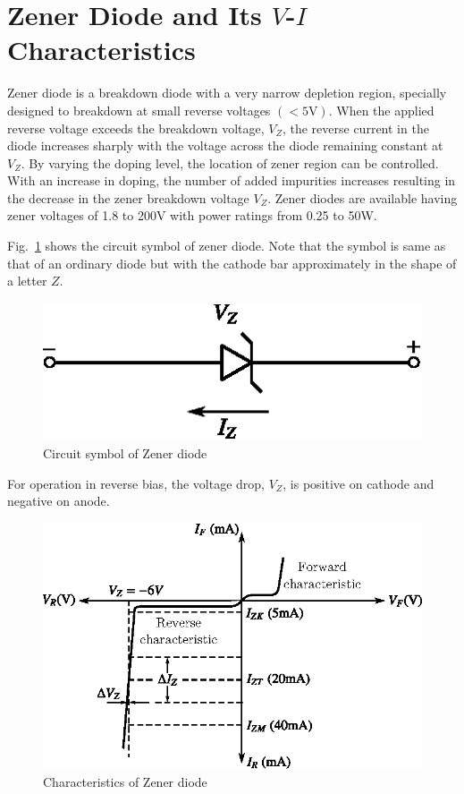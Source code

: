 \section[Zener Diode and Its $V$-$I$ Characteristics]{Zener Diode and Its \boldmath$V$-$I$ Characteristics}\label{sec1.23}

Zener diode is a breakdown diode with a very narrow depletion region, specially designed to breakdown at small reverse voltages $(<5\text{V})$. When the applied reverse voltage exceeds the breakdown voltage, $V_{Z}$, the reverse current in the diode increases sharply with the voltage across the diode remaining constant at $V_{Z}$. By varying the doping level, the location of zener region can be controlled. With an increase in doping, the number of added impurities increases resulting in the decrease in the zener breakdown voltage $V_{Z}$. Zener diodes are available having zener voltages of 1.8 to 200V with power ratings from 0.25 to 50W.

Fig.~\ref{fig1.27} shows the circuit symbol of zener diode. Note that the symbol is same as that of an ordinary diode but with the cathode bar approximately in the shape of a letter $Z$.
\begin{figure}[H]
\centering
\includegraphics[scale=.9]{chap1/fig1.27.eps}
\caption{Circuit symbol of Zener diode}\label{fig1.27}
\end{figure}

For operation in reverse bias, the voltage drop, $V_{Z}$, is positive on cathode and negative on anode.
\begin{figure}[H]
\centering
\includegraphics[scale=.95]{chap1/addfig1.28.eps}
\caption{Characteristics of Zener diode}\label{fig1.28}
\end{figure}

